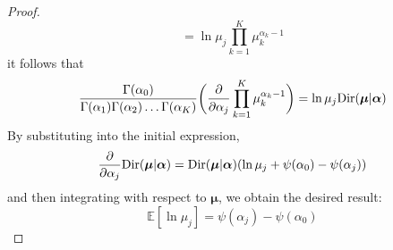 \begin{proof}
\[        = \ln \mu_j \prod_{k = 1}^K \mu_k^{\alpha_k - 1}
    \] 
    it follows that
    \[
        \frac{\Gamma(\alpha_0)}{\Gamma(\alpha_1)\Gamma(\alpha_2)\ldots\Gamma(\alpha_K)}
        \bigg(\pdv{\alpha_j}\prod_{k = 1}^K \mu_k^{\alpha_k - 1}\bigg)
        = \ln \mu_j \text{Dir}(\bm{\mu} | \bm{\alpha})
    \] 
    By substituting into the initial expression,
    \[
        \pdv{\alpha_j} \text{Dir}(\bm{\mu} | \bm{\alpha})
        = \text{Dir}(\bm{\mu} | \bm{\alpha}) (\ln \mu_j + \psi(\alpha_0) - \psi(\alpha_j))
    \] 
    and then integrating with respect to $\bm{\mu}$, we obtain the 
    desired result:
    \[
        \mathbb{E}[\ln{\mu_j}] = \psi(\alpha_j) - \psi(\alpha_0) 
        \tag{2.276}
    \] 
\end{proof}

